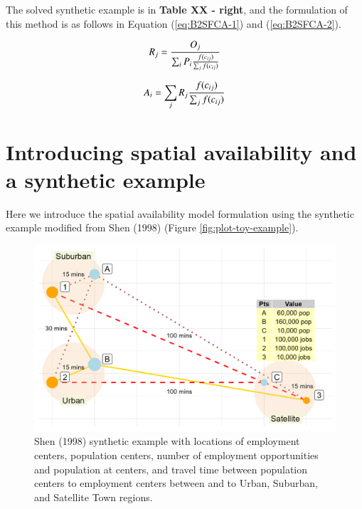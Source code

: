 \documentclass[]{elsarticle} %
\begin{document}
The solved synthetic example is in \textbf{Table XX - right}, and the
formulation of this method is as follows in Equation (\ref{eq:B2SFCA-1})
and (\ref{eq:B2SFCA-2}).

\begin{equation}
\label{eq:B2SFCA-1}
R_{j} = \frac{O_{j}}{\sum_i P_{i} \frac{f(c_{ij})}{\sum_j f(c_{ij})}}\\
\end{equation}

\begin{equation}
\label{eq:B2SFCA-2}
A_{i} = {\sum_j R_{j}\frac{f(c_{ij})}{\sum_j f(c_{ij})}}\\
\end{equation}

\hypertarget{introducing-spatial-availability-and-a-synthetic-example}{%
\section{Introducing spatial availability and a synthetic
example}\label{introducing-spatial-availability-and-a-synthetic-example}}

Here we introduce the spatial availability model formulation using the
synthetic example modified from Shen (1998) (Figure
\ref{fig:plot-toy-example}).

\begin{figure}

{\centering \includegraphics[width=1\linewidth]{images/plot-toy-example} 

}

\caption{\label{fig:plot-toy-example} Shen (1998) synthetic example with locations of employment centers, population centers, number of employment opportunities and population at centers, and travel time between population centers to employment centers between and to Urban, Suburban, and Satellite Town regions.}\label{fig:create-figure-with-toy-example3}
\end{figure}
\end{document}
